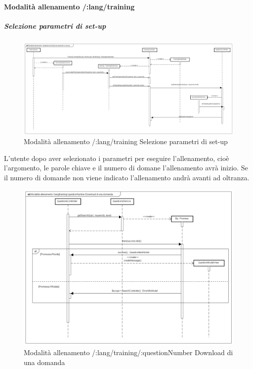 \paragraph{Modalità allenamento /:lang/training}

\subparagraph{Selezione parametri di set-up}

\label{Modalità allenamento /:lang/training Selezione parametri di set-up}

\begin{figure}[ht]
	\centering
	\includegraphics[scale=0.25,keepaspectratio]{UML/DiagrammiDiSequenza/Front-End/Training_setUp.png}
	\caption{Modalità allenamento /:lang/training Selezione parametri di set-up}
\end{figure} \FloatBarrier

L'utente dopo aver selezionato i parametri per eseguire l'allenamento, cioè l'argomento, le parole chiave e il numero di domane l'allenamento avrà inizio. Se il numero di domande non viene indicato l'allenamento andrà avanti ad oltranza.


\label{Modalità allenamento /:lang/training/:questionNumber Download di una domanda}

\begin{figure}[ht]
	\centering
	\includegraphics[scale=0.25,keepaspectratio]{UML/DiagrammiDiSequenza/Front-End/Training_downloadAquestion.png}
	\caption{Modalità allenamento /:lang/training/:questionNumber Download di una domanda}
\end{figure} \FloatBarrier

